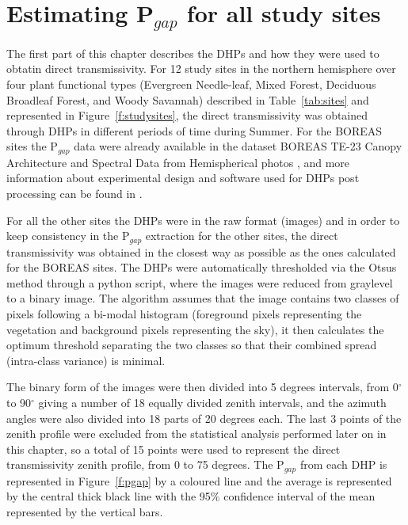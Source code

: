 \section{Estimating P$_{gap}$ for all study sites}\label{section:hemiphotos}

The first part of this chapter describes the DHPs and how they were used to obtatin direct transmissivity. For 12 study sites in the northern hemisphere over four plant functional types (Evergreen Needle-leaf, Mixed Forest, Deciduous Broadleaf Forest, and Woody Savannah) described in Table~\ref{tab:sites} and represented in Figure~\ref{f:studysites}, the direct transmissivity was obtained through DHPs in different periods of time during Summer. For the BOREAS sites the P$_{gap}$ data were already available in the dataset BOREAS TE-23 Canopy Architecture and Spectral Data from Hemispherical photos \citep{Rich1999a}, and more information about experimental design and software used for DHPs post processing can be found in \citet{chen1997}.

For all the other sites the DHPs were in the raw format (images) and in order to keep consistency in the P$_{gap}$ extraction for the other sites, the direct transmissivity was obtained in the closest way as possible as the ones calculated for the BOREAS sites. The DHPs were automatically thresholded via the Otsu\textquotesingle s method \citep{Otsu1979} through a python script, where the images were reduced from graylevel to a binary image. The algorithm assumes that the image contains two classes of pixels following a bi-modal histogram (foreground pixels representing the vegetation and background pixels representing the sky), it then calculates the optimum threshold separating the two classes so that their combined spread (intra-class variance) is minimal.

The binary form of the images were then divided into 5 degrees intervals, from 0$^{\circ}$ to 90$^{\circ}$ giving a number of 18 equally divided zenith intervals, and the azimuth angles were also divided into 18 parts of 20 degrees each. The last 3 points of the zenith profile were excluded from the statistical analysis performed later on in this chapter, so a total of 15 points were used to represent the direct transmissivity zenith profile, from 0 to 75 degrees. The P$_{gap}$ from each DHP is represented in Figure~\ref{f:pgap} by a coloured line and the average is represented by the central thick black line with the 95\% confidence interval of the mean represented by the vertical bars. 

